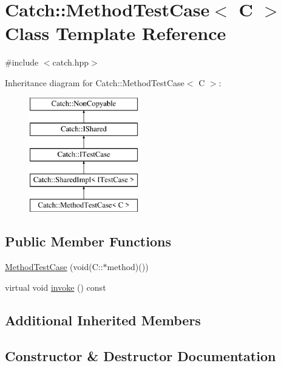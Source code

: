 \hypertarget{class_catch_1_1_method_test_case}{}\section{Catch\+:\+:Method\+Test\+Case$<$ C $>$ Class Template Reference}
\label{class_catch_1_1_method_test_case}


{\ttfamily \#include $<$catch.\+hpp$>$}

Inheritance diagram for Catch\+:\+:Method\+Test\+Case$<$ C $>$\+:\begin{figure}[H]
\begin{center}
\leavevmode
\includegraphics[height=5.000000cm]{class_catch_1_1_method_test_case}
\end{center}
\end{figure}
\subsection*{Public Member Functions}
\begin{DoxyCompactItemize}
\item 
\mbox{\hyperlink{class_catch_1_1_method_test_case_a7b043b85dae371358255dd9dc6582e7b}{Method\+Test\+Case}} (void(C\+::$\ast$method)())
\item 
virtual void \mbox{\hyperlink{class_catch_1_1_method_test_case_a4e2263cfa0646f2980768328cb372793}{invoke}} () const
\end{DoxyCompactItemize}
\subsection*{Additional Inherited Members}


\subsection{Constructor \& Destructor Documentation}
\mbox{\label{class_catch_1_1_method_test_case_a7b043b85dae371358255dd9dc6582e7b}} 
